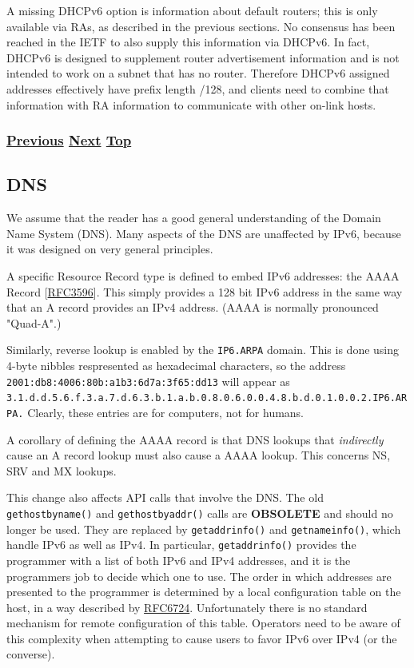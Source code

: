 \documentclass[
]{article}
\begin{document}
A missing DHCPv6 option is information about default routers; this is
only available via RAs, as described in the previous sections. No
consensus has been reached in the IETF to also supply this information
via DHCPv6. In fact, DHCPv6 is designed to supplement router
advertisement information and is not intended to work on a subnet that
has no router. Therefore DHCPv6 assigned addresses effectively have
prefix length /128, and clients need to combine that information with RA
information to communicate with other on-link hosts.

\subsubsection{\texorpdfstring{\hyperref[auto-configuration]{Previous}
\hyperref[dns]{Next}
\hyperref[ipv6-basic-technology]{Top}}{Previous Next Top}}\label{previous-next-top-11}

\pagebreak

\subsection{DNS}\label{dns}

We assume that the reader has a good general understanding of the Domain
Name System (DNS). Many aspects of the DNS are unaffected by IPv6,
because it was designed on very general principles.

A specific Resource Record type is defined to embed IPv6 addresses: the
AAAA Record
{[}\href{https://www.rfc-editor.org/info/rfc3596}{RFC3596}{]}. This
simply provides a 128 bit IPv6 address in the same way that an A record
provides an IPv4 address. (AAAA is normally pronounced "Quad-A".)

Similarly, reverse lookup is enabled by the \texttt{IP6.ARPA} domain.
This is done using 4-byte nibbles respresented as hexadecimal
characters, so the address
\texttt{2001:db8:4006:80b:a1b3:6d7a:3f65:dd13} will appear as
\texttt{3.1.d.d.5.6.f.3.a.7.d.6.3.b.1.a.b.0.8.0.6.0.0.4.8.b.d.0.1.0.0.2.IP6.ARPA.}
Clearly, these entries are for computers, not for humans.

A corollary of defining the AAAA record is that DNS lookups that
\emph{indirectly} cause an A record lookup must also cause a AAAA
lookup. This concerns NS, SRV and MX lookups.

This change also affects API calls that involve the DNS. The old
\texttt{gethostbyname()} and \texttt{gethostbyaddr()} calls are
\textbf{OBSOLETE} and should no longer be used. They are replaced by
\texttt{getaddrinfo()} and \texttt{getnameinfo()}, which handle IPv6 as
well as IPv4. In particular, \texttt{getaddrinfo()} provides the
programmer with a list of both IPv6 and IPv4 addresses, and it is the
programmer\textquotesingle s job to decide which one to use. The order
in which addresses are presented to the programmer is determined by a
local configuration table on the host, in a way described by
\href{https://www.rfc-editor.org/info/rfc6724}{RFC6724}. Unfortunately
there is no standard mechanism for remote configuration of this table.
Operators need to be aware of this complexity when attempting to cause
users to favor IPv6 over IPv4 (or the converse).
\end{document}
